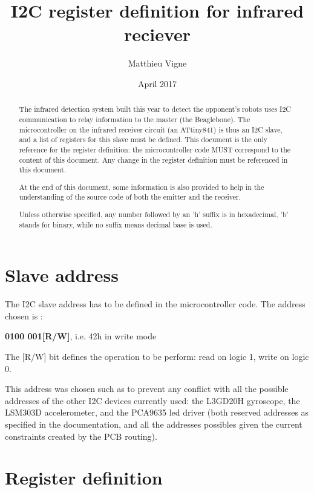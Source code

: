 \documentclass[a4paper,11pt]{article}
\title{I2C register definition for infrared reciever}
\author{Matthieu Vigne}
\date{April 2017}
\begin{document}
\maketitle
\tableofcontents

\begin{abstract}
  
\indent \par The infrared detection system built this year to detect the opponent's robots uses I2C communication to relay information to the master (the Beaglebone). The microcontroller on the infrared receiver circuit (an ATtiny841) is thus an I2C slave, and a list of registers for this slave must be defined. This document is the only reference for the register definition: the microcontroller code MUST correspond to the content of this document. Any change in the register definition must be referenced in this document.
\par At the end of this document, some information is also provided to help in the understanding of the source code of both the emitter and the receiver.

\par Unless otherwise specified, any number followed by an 'h' suffix is in hexadecimal, 'b' stands for binary, while no suffix means decimal base is used.
\end{abstract}

\section{Slave address}
\indent \par The I2C slave address has to be defined in the microcontroller code. The address chosen is :\\
\par \centerline{\textbf{0100 001[R/W]}, i.e. 42h in write mode}
\bigskip
\par The [R/W] bit defines the operation to be perform: read on logic 1, write on logic 0.
\par This address was chosen such as to prevent any conflict with all the possible addresses of the other I2C devices currently used: the L3GD20H gyroscope, the LSM303D accelerometer, and the PCA9635 led driver (both reserved addresses as specified in the documentation, and all the addresses possibles given the current constraints created by the PCB routing).

\section{Register definition}
\end{document}
